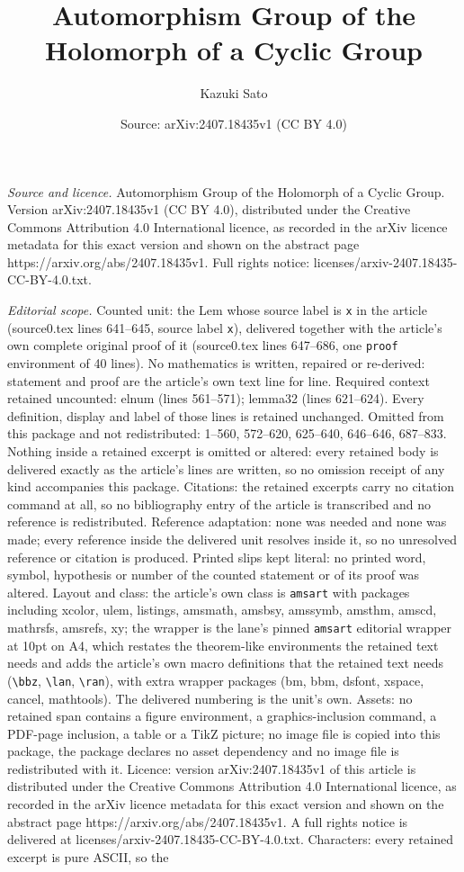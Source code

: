 \documentclass[10pt,a4paper]{amsart}
\title[Automorphism Group of the Holomorph of a Cyclic Group]{Automorphism Group of the Holomorph of a Cyclic Group}
\author{Kazuki Sato}
\date{Source: arXiv:2407.18435v1 (CC BY 4.0)}
\begin{document}
\maketitle

\noindent\emph{Source and licence.} Automorphism Group of the Holomorph of a Cyclic Group. Version arXiv:2407.18435v1 (CC BY 4.0), distributed under the Creative Commons Attribution 4.0 International licence, as recorded in the arXiv licence metadata for this exact version and shown on the abstract page https://arxiv.org/abs/2407.18435v1. Full rights notice: licenses/arxiv-2407.18435-CC-BY-4.0.txt.\par\smallskip

\noindent\textit{Editorial scope.} Counted unit: the Lem whose source label is \texttt{x} in the article (source0.tex lines 641--645, source label \texttt{x}), delivered together with the article's own complete original proof of it (source0.tex lines 647--686, one \texttt{proof} environment of 40 lines). No mathematics is written, repaired or re-derived: statement and proof are the article's own text line for line. Required context retained uncounted: elnum (lines 561--571); lemma32 (lines 621--624). Every definition, display and label of those lines is retained unchanged. Omitted from this package and not redistributed: 1--560, 572--620, 625--640, 646--646, 687--833. Nothing inside a retained excerpt is omitted or altered: every retained body is delivered exactly as the article's lines are written, so no omission receipt of any kind accompanies this package. Citations: the retained excerpts carry no citation command at all, so no bibliography entry of the article is transcribed and no reference is redistributed. Reference adaptation: none was needed and none was made; every reference inside the delivered unit resolves inside it, so no unresolved reference or citation is produced. Printed slips kept literal: no printed word, symbol, hypothesis or number of the counted statement or of its proof was altered. Layout and class: the article's own class is \texttt{amsart} with packages including xcolor, ulem, listings, amsmath, amsbsy, amssymb, amsthm, amscd, mathrsfs, amsrefs, xy; the wrapper is the lane's pinned \texttt{amsart} editorial wrapper at 10pt on A4, which restates the theorem-like environments the retained text needs and adds the article's own macro definitions that the retained text needs (\texttt{\textbackslash bbz}, \texttt{\textbackslash lan}, \texttt{\textbackslash ran}), with extra wrapper packages (bm, bbm, dsfont, xspace, cancel, mathtools). The delivered numbering is the unit's own. Assets: no retained span contains a figure environment, a graphics-inclusion command, a PDF-page inclusion, a table or a TikZ picture; no image file is copied into this package, the package declares no asset dependency and no image file is redistributed with it. Licence: version arXiv:2407.18435v1 of this article is distributed under the Creative Commons Attribution 4.0 International licence, as recorded in the arXiv licence metadata for this exact version and shown on the abstract page https://arxiv.org/abs/2407.18435v1. A full rights notice is delivered at licenses/arxiv-2407.18435-CC-BY-4.0.txt. Characters: every retained excerpt is pure ASCII, so the 
\end{document}
